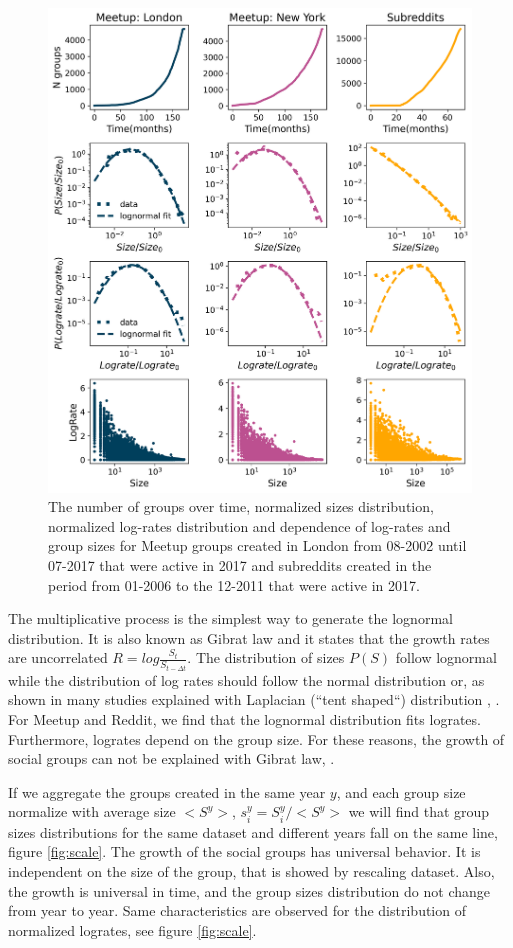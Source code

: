 \begin{figure}[h]
	\centering
	\includegraphics[width=0.8\linewidth]{Figures/figures/Fig2.png}
	\caption{The number of groups over time, normalized sizes distribution, normalized log-rates distribution and dependence of log-rates and group sizes for Meetup groups created in London from 08-2002 until 07-2017 that were active in 2017 and subreddits created in the period from 01-2006 to the  12-2011 that were active in 2017. }
	\label{fig:data1}
\end{figure}  

The multiplicative process \cite{mitzenmacher2004brief} is the simplest way to generate the lognormal distribution. It is also known as Gibrat law and it states that the growth rates are uncorrelated $R = log\frac{S_t}{S_{t-\Delta t}}$. The distribution of sizes $P(S)$ follow lognormal while the distribution of log rates should follow the normal distribution or, as shown in many studies explained with Laplacian (“tent shaped“) distribution \cite{mondani2014fat}, \cite{fu2005growth}. For Meetup and Reddit, we find that the lognormal distribution fits logrates. Furthermore, logrates depend on the group size. For these reasons, the growth of social groups can not be explained with Gibrat law, \cite{frasco2014spatially, qian2014origin}.

If we aggregate the groups created in the same year $y$, and each group size normalize with average size $<S^y>$, $s^{y}_{i}=S^{y}_{i}/<S^{y}>$ we will find that group sizes distributions for the same dataset and different years fall on the same line, figure \ref{fig:scale}. The growth of the social groups has universal behavior. It is independent on the size of the group, that is showed by rescaling dataset. Also, the growth is universal in time, and the group sizes distribution do not change from year to year. Same characteristics are observed for the distribution of normalized logrates, see figure \ref{fig:scale}. 



